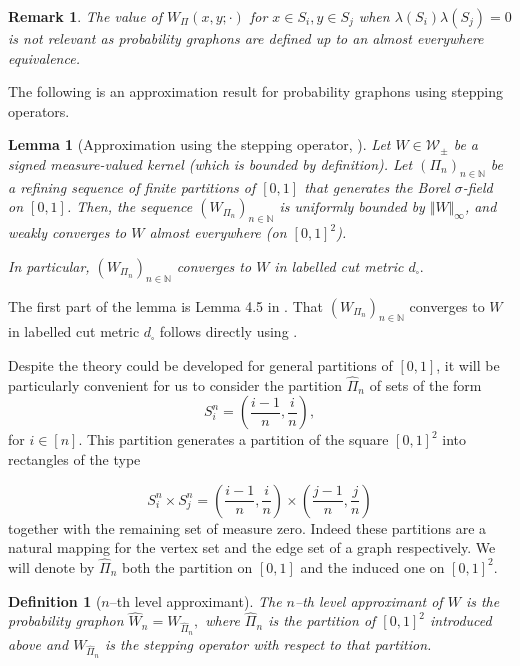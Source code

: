 \documentclass[12pt,twoside,a4paper]{article}
\newtheorem{lemma}[theorem]{Lemma}
\newtheorem{definition}[theorem]{Definition}
\newtheorem{remark}[theorem]{Remark}
\def\N{\mathbb{N}}
\newcommand{\signed}{\pm}
\newcommand{\Kernel}{\mathcal{W}_{\signed}}
\newcommand{\TM}[1]{\norm{#1}_\infty}
\newcommand{\norm}[1]{\Vert#1\Vert}
\begin{document}
\begin{remark}
The value of $ W_\Pi(x,y;\cdot)$ for  $ x\in
S_i, y\in S_j$ when $\lambda(S_i)\lambda(S_j)=0$ is not relevant as probability graphons are defined up to an almost everywhere equivalence. 
\end{remark}

The following is an approximation result for probability graphons using stepping operators.

\begin{lemma}[Approximation using the stepping operator, {\cite[Lemma 4.5]{abraham2023probabilitygraphons}}]
\label{lem:approx-W-p}
Let $W\in \Kernel$ be a signed measure-valued kernel
 (which is bounded by definition). 
Let  $(\Pi_n  )_{n\in\N}$  be  a  refining sequence  of   finite
partitions  of  $[0,1]$  that  generates the Borel $\sigma$-field on $[0,1]$.   
Then,  the  sequence $(W_{\Pi_n}  )_{n\in\N}$  
is uniformly  bounded by  $\TM{W}$, and
weakly converges to $W$ almost everywhere (on $[0,1]^2$).

In particular, $(W_{\Pi_n}  )_{n\in\N}$ converges to $W$ in labelled cut metric $d_{\square}.$
\end{lemma}
\proof
The first part of the lemma is Lemma 4.5 in \cite{abraham2023probabilitygraphons}. That $(W_{\Pi_n}  )_{n\in\N}$ converges to $W$ in labelled cut metric $d_{\square}$ follows directly using \cite[Lemma 3.13]{abraham2023probabilitygraphons}. 
\endproof


Despite the theory could be developed for general partitions of $[0,1]$, it will be particularly convenient for us to consider the partition $\widehat{\Pi}_n$ of sets of the form \[
S^n_i=\left( \frac{i-1}{n}, \frac{i}{n} \right) ,\]
for $i\in[n]$. This partition generates a partition of the square $[0,1]^2$ into rectangles of the type

\[S^n_i\times S^n_j=\left( \frac{i-1}{n}, \frac{i}{n} \right)\times \left( \frac{j-1}{n}, \frac{j}{n} \right)
\]
together with the remaining set of measure zero. Indeed these partitions are a natural mapping for the vertex set and the edge set of a graph respectively. We will denote by $\widehat{\Pi}_n$ both the partition on $[0,1]$ and the induced one on $[0,1]^2$.


\begin{definition}[$n$--th level approximant]\label{def:Approximants}
The $n$--th level approximant of $W$ is the probability graphon $\widehat{W}_n= W_{\widehat{\Pi}_n},$ where $\widehat{\Pi}_n$ is the partition of $[0,1]^2$ introduced above and $W_{\widehat{\Pi}_n}$ is the stepping operator with respect to that partition.\end{definition}
\end{document}
